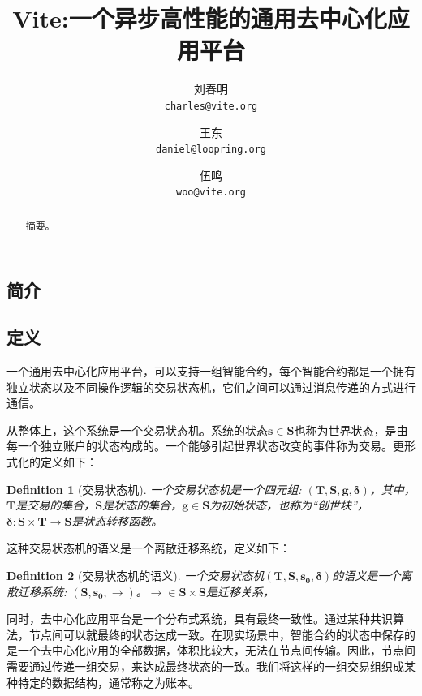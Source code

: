 \documentclass[UTF8,nofonts]{ctexart}
\title{\textbf{Vite:}\textbf{一个异步高性能的通用去中心化应用平台}}
\author{
  刘春明\\
  \texttt{charles@vite.org}\\
  \and
  	王东\\
  	\texttt{daniel@loopring.org}\\
  	\and
  	伍鸣\\
  	\texttt{woo@vite.org}\\
 }
\newtheorem{definition}{Definition}[section]
\begin{document}
\maketitle

\begin{abstract}
摘要。
\end{abstract}

\begin{multicols}{2}

\section{简介}
\subsection{定义}

一个通用去中心化应用平台，可以支持一组智能合约，每个智能合约都是一个拥有独立状态以及不同操作逻辑的交易状态机，它们之间可以通过消息传递的方式进行通信。

从整体上，这个系统是一个交易状态机。系统的状态$\boldsymbol{s}\in\boldsymbol{S}$也称为世界状态，是由每一个独立账户的状态构成的。一个能够引起世界状态改变的事件称为交易。更形式化的定义如下：

\begin{definition}[交易状态机] \label{def-fsm}
一个交易状态机是一个四元组: $(\boldsymbol{T},\boldsymbol{S},\boldsymbol{g},\boldsymbol{{\delta}})$，其中，$\boldsymbol{T}$是交易的集合，$\boldsymbol{S}$是状态的集合，$\boldsymbol{g} \in \boldsymbol{S}$为初始状态，也称为“创世块”，$\boldsymbol{{\delta}:\boldsymbol{S}\times\boldsymbol{T}\rightarrow\boldsymbol{S}}$是状态转移函数。
\end{definition}

这种交易状态机的语义是一个离散迁移系统，定义如下：
\begin{definition}[交易状态机的语义] \label{def-semantics}
一个交易状态机$(\boldsymbol{T},\boldsymbol{S},\boldsymbol{s_{0}},\boldsymbol{{\delta}})$的语义是一个离散迁移系统: $(\boldsymbol{S},\boldsymbol{s_{0}},\boldsymbol{\rightarrow})$。$\boldsymbol{\rightarrow} \in \boldsymbol{S}\times\boldsymbol{S}$是迁移关系，
\end{definition}

同时，去中心化应用平台是一个分布式系统，具有最终一致性。通过某种共识算法，节点间可以就最终的状态达成一致。在现实场景中，智能合约的状态中保存的是一个去中心化应用的全部数据，体积比较大，无法在节点间传输。因此，节点间需要通过传递一组交易，来达成最终状态的一致。我们将这样的一组交易组织成某种特定的数据结构，通常称之为账本。


\end{multicols}
\end{document}
